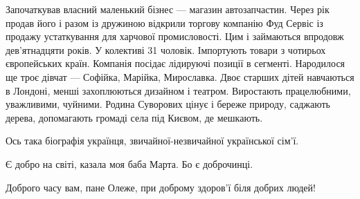 Започаткував власний маленький бізнес --- магазин автозапчастин. Через рік продав
його і разом із дружиною відкрили торгову компанію Фуд Сервіс із продажу
устаткування для харчової промисловості. Цим і займаються впродовж
дев’ятнадцяти років. У колективі 31 чоловік. Імпортують товари з чотирьох
європейських країн. Компанія посідає лідируючі позиції в сегменті. Народилося
ще троє дівчат --- Софійка, Марійка, Мирославка. Двоє старших дітей навчаються в
Лондоні, менші захоплюються дизайном і театром. Виростають працелюбними,
уважливими, чуйними. Родина Суворових цінує і береже природу, саджають дерева,
допомагають громаді села під Києвом, де мешкають.

Ось така біографія українця, звичайної-незвичайної української сім’ї.

Є добро на світі, казала моя баба Марта. Бо є доброчинці.

Доброго часу вам, пане Олеже, при доброму здоров’ї біля добрих людей!
